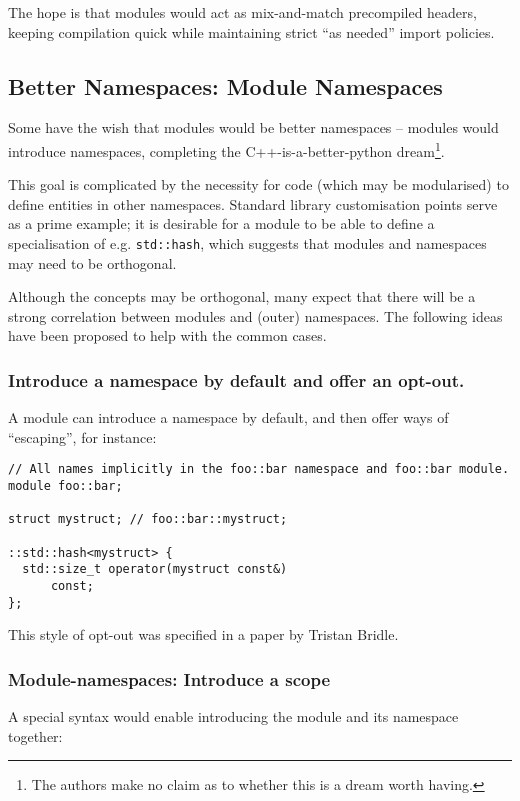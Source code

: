 \documentclass[reqno]{article}
\begin{document}
The hope is that modules would act as mix-and-match precompiled headers,
keeping compilation quick while maintaining strict ``as needed'' import policies.


\subsection{Better Namespaces: Module Namespaces}

Some have the wish that modules would be better namespaces -- modules would
introduce namespaces, completing the C++-is-a-better-python dream\footnote{The
authors make no claim as to whether this is a dream worth having.}.

This goal is complicated by the necessity for code (which may be modularised)
to define entities in other namespaces. Standard library customisation points
serve as a prime example; it is desirable for a module to be able to define a
specialisation of e.g. \texttt{std::hash}, which suggests that modules and
namespaces may need to be orthogonal.

Although the concepts may be orthogonal, many expect that there will be a
strong correlation between modules and (outer) namespaces. The following ideas
have been proposed to help with the common cases.


\subsubsection{Introduce a namespace by default and offer an opt-out.}

A module can introduce a namespace by default, and then offer ways of
``escaping'', for instance:

\begin{verbatim}
// All names implicitly in the foo::bar namespace and foo::bar module.
module foo::bar;

struct mystruct; // foo::bar::mystruct;

::std::hash<mystruct> {
  std::size_t operator(mystruct const&)
      const;
};
\end{verbatim}

This style of opt-out was specified in a paper by Tristan Bridle.~\citep{P0665R0}


\subsubsection{Module-namespaces: Introduce a scope}

A special syntax would enable introducing the module and its namespace together:
\end{document}
